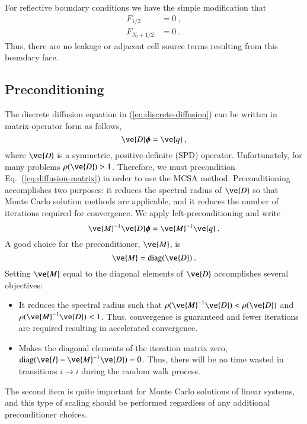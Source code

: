 \documentclass[preprint,12pt]{elsarticle}
\newcommand{\vI}{\ensuremath{\ve{I}}}
\newcommand{\bphi}{\ensuremath{\boldsymbol{\phi}}}
\DeclareMathOperator{\diag}{diag}
\begin{document}
For reflective boundary conditions we have the simple modification
that
\begin{align}
  F_{1/2} &= 0\:, \\
  F_{N_l+1/2} &= 0\:.
\end{align}
Thus, there are no leakage or adjacent cell source terms resulting
from this boundary face.

\subsection{Preconditioning}
\label{sec:preconditioning}

The discrete diffusion equation in (\ref{eq:discrete-diffusion}) can
be written in matrix-operator form as follows,
\begin{equation}
  \ve{D}\bphi = \ve{q}\:,
  \label{eq:diffusion-matrix}
\end{equation}
where $\ve{D}$ is a symmetric, positive-definite (SPD) operator.
Unfortunately, for many problems $\rho(\ve{D}) > 1$.  Therefore, we
must precondition Eq.~(\ref{eq:diffusion-matrix}) in order to use the
MCSA method.  Preconditioning accomplishes two purposes: it reduces
the spectral radius of $\ve{D}$ so that Monte Carlo solution methods
are applicable, and it reduces the number of iterations required for
convergence.  We apply left-preconditioning and write
\begin{equation}
  \ve{M}^{-1}\ve{D}\bphi = \ve{M}^{-1}\ve{q}\:.
  \label{eq:preconditioned-diffusion}
\end{equation}
A good choice for the preconditioner, $\ve{M}$, is
\begin{equation}
  \ve{M}=\diag(\ve{D})\:.
  \label{eq:preconditioner}
\end{equation}
Setting $\ve{M}$ equal to the diagonal elements of $\ve{D}$
accomplishes several objectives:
\begin{itemize}
\item It reduces the spectral radius such that
  $\rho(\ve{M}^{-1}\ve{D}) < \rho(\ve{D})$ and
  $\rho(\ve{M}^{-1}\ve{D}) < 1$.  Thus, convergence is guaranteed and
  fewer iterations are required resulting in accelerated convergence.
\item Makes the diagonal elements of the iteration matrix zero,
  $\diag(\vI - \ve{M}^{-1}\ve{D}) = 0$.  Thus, there will be no time
  wasted in transitions $i\rightarrow i$ during the random walk
  process.
\end{itemize}
The second item is quite important for Monte Carlo solutions of linear
systems, and this type of scaling should be performed regardless of
any additional preconditioner choices.  
\end{document}
